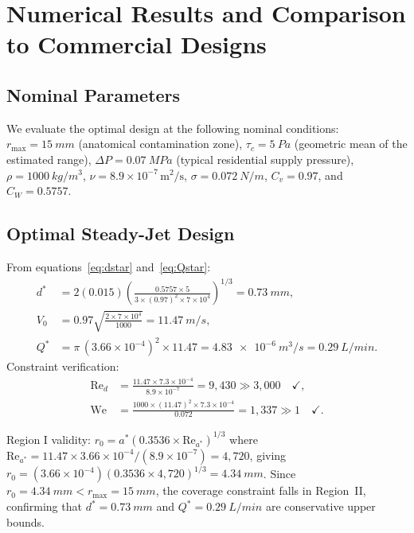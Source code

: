 \documentclass[aps,prfluids,reprint,amsmath,amssymb,floatfix]{revtex4-2}
\newcommand{\Rey}{\mathrm{Re}}
\newcommand{\We}{\mathrm{We}}
\begin{document}
\section{Numerical Results and Comparison to Commercial Designs}
\label{sec:results}

\subsection{Nominal Parameters}
\label{subsec:nominal}

We evaluate the optimal design at the following nominal conditions:
$r_\mathrm{max} = \SI{15}{mm}$ (anatomical contamination zone),
$\tau_c = \SI{5}{Pa}$ (geometric mean of the estimated range),
$\Delta P = \SI{0.07}{MPa}$ (typical residential supply pressure),
$\rho = \SI{1000}{kg/m^3}$, $\nu = 8.9 \times 10^{-7}\,\mathrm{m^2/s}$,
$\sigma = \SI{0.072}{N/m}$, $C_v = 0.97$, and $C_W = 0.5757$.

\subsection{Optimal Steady-Jet Design}
\label{subsec:opt_results}

From equations~\eqref{eq:dstar} and~\eqref{eq:Qstar}:
\begin{align}
  d^* &= 2(0.015)\left(\frac{0.5757 \times 5}
        {3 \times (0.97)^2 \times 7\times10^4}\right)^{1/3}
        = \SI{0.73}{mm},
  \label{eq:dstarnum}\\
  V_0 &= 0.97\sqrt{\frac{2 \times 7\times10^4}{1000}} = \SI{11.47}{m/s},
  \label{eq:V0num}\\
  Q^* &= \pi\,(3.66\times10^{-4})^2 \times 11.47
        = \SI{4.83e-6}{m^3/s} = \SI{0.29}{L/min}.
  \label{eq:Qstarnum}
\end{align}
Constraint verification:
\begin{align}
  \Rey_d &= \frac{11.47 \times 7.3\times10^{-4}}{8.9\times10^{-7}}
           = 9{,}430 \gg 3{,}000 \quad \checkmark,
  \label{eq:Rechecknum}\\
  \We &= \frac{1000 \times (11.47)^2 \times 7.3\times10^{-4}}{0.072}
       = 1{,}337 \gg 1 \quad \checkmark.
  \label{eq:Wechecknum}
\end{align}

Region I validity: $r_0 = a^*(0.3536 \times \Rey_{a^*})^{1/3}$
where $\Rey_{a^*} = 11.47 \times 3.66\times10^{-4}/(8.9\times10^{-7}) = 4{,}720$,
giving $r_0 = (3.66\times10^{-4})(0.3536 \times 4{,}720)^{1/3} = \SI{4.34}{mm}$.
Since $r_0 = \SI{4.34}{mm} < r_\mathrm{max} = \SI{15}{mm}$, the coverage
constraint falls in Region~II, confirming that $d^* = \SI{0.73}{mm}$ and
$Q^* = \SI{0.29}{L/min}$ are conservative upper bounds.
\end{document}

